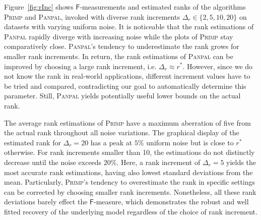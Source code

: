 Figure~\ref{fig:rInc} shows $\mathsf{F}$-measurements and estimated ranks of the algorithms \textsc{Primp} and \textsc{Panpal}, invoked with diverse rank increments $\Delta_r\in \{2,5,10,20\}$ on datasets with varying uniform noise. It is noticeable that the rank estimations of \textsc{Panpal} rapidly diverge  with increasing noise while the plots of \textsc{Primp} stay comparatively close. \textsc{Panpal}'s tendency to underestimate the rank grows for smaller rank increments. In return, the rank estimations of \textsc{Panpal} can be improved by choosing a large rank increment, i.e. $\Delta_r\approx r^*$. However, since we do not know the rank in real-world applications, different increment values have to be tried and compared, contradicting our goal to automatically determine this parameter. Still, \textsc{Panpal} yields potentially useful lower bounds on the actual rank.

The average rank estimations of \textsc{Primp} have a maximum aberration of five from the actual rank throughout all noise variations. The graphical display of the estimated rank for $\Delta_r=20$ has a peak at $5\%$ uniform noise but is close to $r^*$ otherwise. For rank increments smaller than 10, the estimations do not distinctly decrease until the noise exceeds $20\%$. Here, a rank increment of $\Delta_r=5$ yields the most accurate rank estimations, having also lowest standard deviations from the mean. Particularly, \textsc{Primp}'s tendency to overestimate the rank in specific settings can be corrected by choosing smaller rank increments. Nonetheless, all these rank deviations barely effect the $\mathsf{F}$-measure, which demonstrates the robust and well fitted recovery of the underlying model regardless of the choice of rank increment. 
